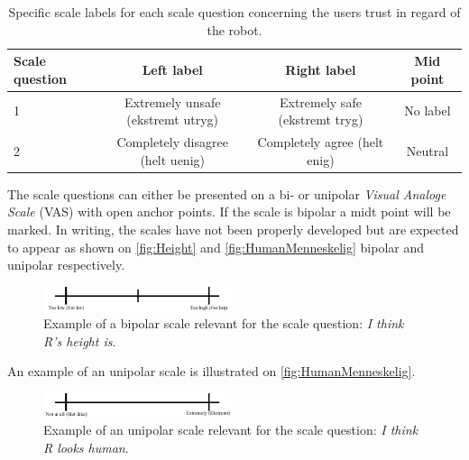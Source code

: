%
\begin{table}[H]
	\centering
	\begin{tabular}{l|c|c|c}
		Scale question     & Left label & Right label & Mid point \\\hline
		1   & \makecell{Extremely unsafe\\ (ekstremt utryg)} & Extremely safe (ekstremt tryg) & No label          \\\hline
		2   & Completely disagree (helt uenig) & Completely agree (helt enig) & Neutral 
	\end{tabular}
	\caption{Specific scale labels for each scale question concerning the users trust in regard of the robot.}
	\label{tab:Latin}         
\end{table}
\noindent
%
The scale questions can either be presented on a bi- or unipolar \textit{Visual Analoge Scale} (VAS) with open anchor points. If the scale is bipolar a midt point will be marked. In writing, the scales have not been properly developed but are expected to appear as shown on \autoref{fig:Height} and \autoref{fig:HumanMenneskelig} bipolar and unipolar respectively.
%
\begin{figure}[H]
\centering
\includegraphics[width = 0.49\textwidth]{Figure/HeightHoejde} 
\caption{Example of a bipolar scale relevant for the scale question: \textit{I think R's height is}.}
\label{fig:Height}
\end{figure}
\noindent
% 
An example of an unipolar scale is illustrated on \autoref{fig:HumanMenneskelig}.
%
\begin{figure}[H]
\centering
\includegraphics[width = 0.49\textwidth]{Figure/HumanMenneskelig} 
\caption{Example of an unipolar scale relevant for the scale question: \textit{I think R looks human}.}
\label{fig:HumanMenneskelig}
\end{figure}
\noindent
%

